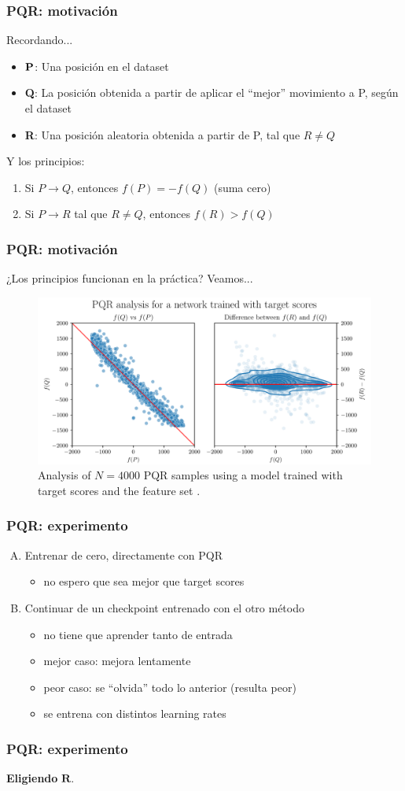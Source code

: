 
\begin{frame}
\frametitle{PQR: motivación}
Recordando...
\begin{itemize}
\item $\bf P$: Una posición en el dataset
\item \textbf{Q}: La posición obtenida a partir de aplicar el \enquote{mejor} movimiento a P, según el dataset
\item \textbf{R}: Una posición aleatoria obtenida a partir de P, tal que $R \neq Q$
\end{itemize}
\pause
Y los principios:
\begin{enumerate}
\item Si $P \rightarrow Q$, entonces $f(P)=-f(Q)$ (suma cero)
\item Si $P \rightarrow R$ tal que $R \neq Q$, entonces $f(R) > f(Q)$
\end{enumerate}
\end{frame}


\begin{frame}
\frametitle{PQR: motivación}
¿Los principios funcionan en la práctica? Veamos...
\begin{figure}
\centering
\includegraphics[width=\textwidth]{../thesis/dynamic/output/pqr_eval.pdf}
\caption{Analysis of $N=4000$ PQR samples using a model trained with target scores and the feature set .}
\end{figure}
\end{frame}

\begin{frame}
\frametitle{PQR: experimento}
\begin{enumerate}[A.]
\item Entrenar de cero, directamente con PQR
\begin{itemize}
\item no espero que sea mejor que target scores
\end{itemize}
\pause
\item Continuar de un checkpoint entrenado con el otro método
\begin{itemize}
\item no tiene que aprender tanto de entrada
\item mejor caso: mejora lentamente
\item peor caso: se \enquote{olvida} todo lo anterior (resulta peor)
\item se entrena con distintos learning rates
\end{itemize}
\end{enumerate}
\end{frame}


\begin{frame}
\frametitle{PQR: experimento}
\textbf{Eligiendo} $\mathbf{R}$.

\end{frame}